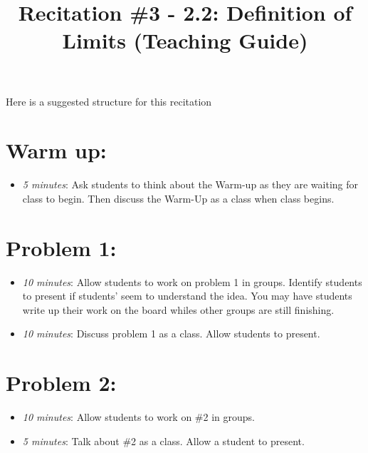 \documentclass[handout,nooutcomes]{ximera}
\title{Recitation \#3 - 2.2:  Definition of Limits (Teaching Guide)}
\begin{document}
\begin{abstract}		\end{abstract}
\maketitle

Here is a suggested structure for this recitation

\section*{Warm up:} 

	\begin{itemize}
	
	\item  \emph{5 minutes}: Ask students to think about the Warm-up as they are waiting for class to begin.  Then discuss the Warm-Up as a class when class begins. 
	
	\end{itemize}


\section*{Problem 1:}

	\begin{itemize}
	
	\item  \emph{10 minutes}:  Allow students to work on problem 1 in groups.  Identify students to present if students’ seem to understand the idea.  You may have students write up their work on the board whiles other groups are still finishing.
	
	\item  \emph{10 minutes}:  Discuss problem 1 as a class.  Allow students to present.
		
	\end{itemize}
	
	
	
\section*{Problem 2:}

	\begin{itemize}
	
	\item  \emph{10 minutes}:  Allow students to work on \#2 in groups.
	
	\item  \emph{5 minutes}:  Talk about \#2 as a class.  Allow a student to present.
	
	\end{itemize}
	
\end{document}
